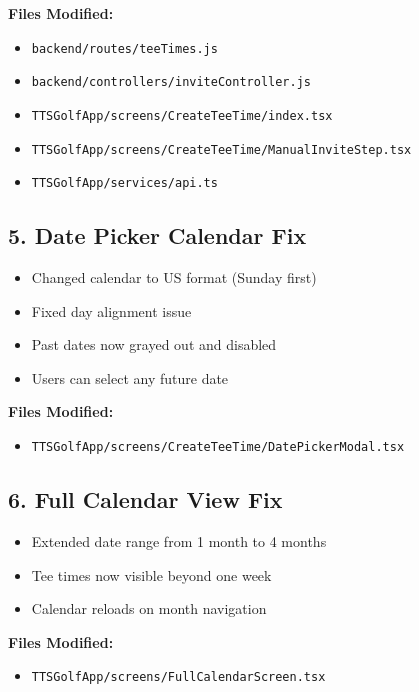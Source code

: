 \documentclass[11pt,a4paper]{article}
\newcommand{\done}{\textcolor{checkgreen}{$\checkmark$}}
\begin{document}
\textbf{Files Modified:}
\begin{itemize}
    \item \texttt{backend/routes/teeTimes.js}
    \item \texttt{backend/controllers/inviteController.js}
    \item \texttt{TTSGolfApp/screens/CreateTeeTime/index.tsx}
    \item \texttt{TTSGolfApp/screens/CreateTeeTime/ManualInviteStep.tsx}
    \item \texttt{TTSGolfApp/services/api.ts}
\end{itemize}

\subsection{5. Date Picker Calendar Fix}
\begin{itemize}[label=\done]
    \item Changed calendar to US format (Sunday first)
    \item Fixed day alignment issue
    \item Past dates now grayed out and disabled
    \item Users can select any future date
\end{itemize}

\textbf{Files Modified:}
\begin{itemize}
    \item \texttt{TTSGolfApp/screens/CreateTeeTime/DatePickerModal.tsx}
\end{itemize}

\subsection{6. Full Calendar View Fix}
\begin{itemize}[label=\done]
    \item Extended date range from 1 month to 4 months
    \item Tee times now visible beyond one week
    \item Calendar reloads on month navigation
\end{itemize}

\textbf{Files Modified:}
\begin{itemize}
    \item \texttt{TTSGolfApp/screens/FullCalendarScreen.tsx}
\end{itemize}

\end{document}
